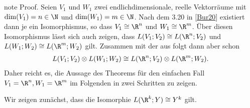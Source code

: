 \documentclass[letterpaper,10pt,english]{jupyterBook}
\begin{document}
\begin{sphinxadmonition}{note}
\sphinxAtStartPar
Proof. Seien \(V_1\) und \(W_1\) zwei endlich\sphinxhyphen{}dimensionale, reelle Vektorräume mit \(\operatorname{dim}(V_1) = n \in \N\) und \(\operatorname{dim}(W_1) = m \in \N\).
Nach dem  3.20 in {[}\hyperlink{cite.references:id2}{Bur20}{]} existiert dann je ein Isomorphismus, so dass \(V_1 \cong \R^n\) und \(W_1 \cong \R^m\).
Über diesen Isomorphismus lässt sich auch zeigen, dass \(L(V_1; V_2) \cong L(\R^n; V_2)\) und \(L(W_1; W_2) \cong L(\R^m; W_2)\) gilt.
Zusammen mit der  aus {\hyperref[\detokenize{vektoranalysis/tensor:lem:natISO}]{}} folgt dann aber schon
\begin{equation*}
\begin{split}L(V_1; V_2)\otimes L(W_1; W_2) \cong L(\R^n; V_2)\otimes L(\R^m; W_2).\end{split}
\end{equation*}
\sphinxAtStartPar
Daher reicht es, die Aussage des Theorems für den einfachen Fall \(V_1=\R^n, W_1=\R^m\) im Folgenden in zwei Schritten zu zeigen.

\sphinxAtStartPar
{} Wir zeigen zunächst, dass die Isomorphie \(L(\R^k; Y) \cong Y^k\) gilt.


\end{sphinxadmonition}
\end{document}
